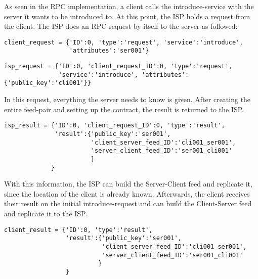 As seen in the RPC implementation, a client calls the introduce-service with the server it wants to be introduced to. At this point, the ISP holds a request from the client. The ISP does an RPC-request by itself to the server as followed:
\\
\begin{python}
    
\begin{lstlisting}
client_request = {'ID':0, 'type':'request', 'service':'introduce', 
                  'attributes':'ser001'}
\end{lstlisting}
\begin{lstlisting}
isp_request = {'ID':0, 'client_request_ID':0, 'type':'request', 
               'service':'introduce', 'attributes':{'public_key':'cli001'}}
\end{lstlisting}
\end{python}


In this request, everything the server needs to know is given. After creating the entire feed-pair and setting up the contract, the result is returned to the ISP.
\\
\begin{python}
    
\begin{lstlisting}
isp_result = {'ID':0, 'client_request_ID':0, 'type':'result', 
              'result':{'public_key':'ser001', 
                        'client_server_feed_ID':'cli001_ser001',
                        'server_client_feed_ID':'ser001_cli001'
                        }
             }
\end{lstlisting}
\end{python}

With this information, the ISP can build the Server-Client feed and replicate it, since the location of the client is already known.
Afterwards, the client receives their result on the initial introduce-request and can build the Client-Server feed and replicate it to the ISP.\\
\begin{python}
    
\begin{lstlisting}
client_result = {'ID':0, 'type':'result', 
                 'result':{'public_key':'ser001', 
                           'client_server_feed_ID':'cli001_ser001', 
                           'server_client_feed_ID':'ser001_cli001'
                          }
                 }
\end{lstlisting}
\end{python}

